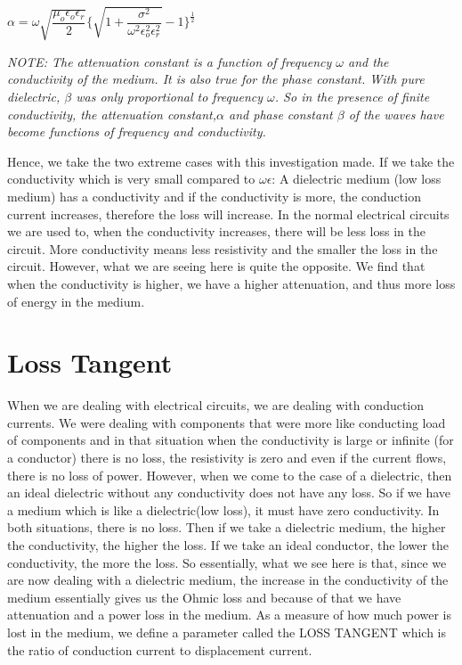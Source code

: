 \begin{center}
$\alpha = \omega\sqrt{\dfrac{\mu_{o}\epsilon_{o}\epsilon_{r}}{2}}\Bigg\{{\sqrt{1 + \dfrac{\sigma^{2}}{\omega^{2}\epsilon_{o}^{2}\epsilon_{r}^{2}}}} - 1\Bigg\}^{\frac{1}{2}}$
\end{center}

\textit{NOTE: The attenuation constant is a function of frequency $\omega$ and the conductivity of the medium. It is also true for the phase constant. With pure dielectric, $\beta$ was only proportional to frequency $\omega$. So in the presence of finite conductivity, the attenuation constant,$\alpha$ and phase constant $\beta$ of the waves have become functions of frequency and conductivity.}

Hence, we take the two extreme cases with this investigation made.
If we take the conductivity which is very small compared to $\omega\epsilon$: A dielectric medium (low loss medium) has a conductivity and if the conductivity is more, the conduction current increases, therefore the loss will increase. In the normal electrical circuits we are used to, when the conductivity increases, there will be less loss in the circuit. More conductivity means less resistivity and the smaller the loss in the circuit. However, what we are seeing here is quite the opposite. We find that when the conductivity is higher, we have a higher attenuation, and thus more loss of energy in the medium.

\section{Loss Tangent}

When we are dealing with electrical circuits, we are dealing with conduction currents. We were dealing with components that were more like conducting load of components and in that situation when the conductivity is large or infinite (for a conductor) there is no loss, the resistivity is zero and even if the current flows, there is no loss of power.
However, when we come to the case of a dielectric, then an ideal dielectric without any conductivity does not have any loss. So if we have a medium which is like a dielectric(low loss), it must have zero conductivity. In both situations, there is no loss. Then if we take a dielectric medium, the higher the conductivity, the higher the loss. If we take an ideal conductor, the lower the conductivity, the more the loss. So essentially, what we see here is that, since we are now dealing with a dielectric medium, the increase in the conductivity of the medium essentially gives us the Ohmic loss and because of that we have attenuation and a power loss in the medium.
As a measure of how much power is lost in the medium, we define a parameter called the LOSS TANGENT which is the ratio of conduction current to displacement current.

